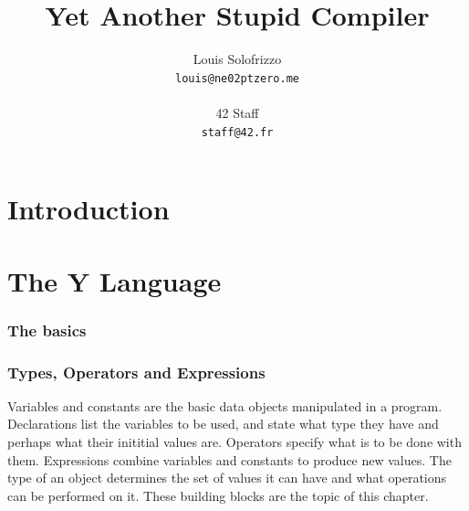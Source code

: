 \documentclass{scrartcl}
\title{Yet Another Stupid Compiler}
\author{
    Louis Solofrizzo\\
    \texttt{louis@ne02ptzero.me}\\
    \\
    42 Staff\\
    \texttt{staff@42.fr}
}
\begin{document}
\begin{titlingpage}
    \maketitle
\end{titlingpage}


    \tableofcontents{}
    \newpage

\part{Introduction}
\part{The Y Language}
    \section{The basics}
        
        
        
        
        \newpage

    \section{Types, Operators and Expressions}
        Variables and constants are the basic data objects manipulated in a
        program. Declarations list the variables to be used, and state what type
        they have and perhaps what their inititial values are. Operators
        specify what is to be done with them. Expressions combine variables and
        constants to produce new values. The type of an object determines the set
        of values it can have and what operations can be performed on it. These
        building blocks are the topic of this chapter.

        
        
        
        
        
        
        
        
        
        
        \newpage
\end{document}
